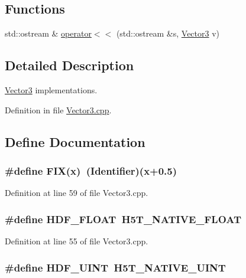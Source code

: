 \subsection*{Functions}
\begin{DoxyCompactItemize}
\item 
std::ostream \& \hyperlink{Vector3_8cpp_a751d7222f22f7264709359319164fdcd}{operator$<$$<$} (std::ostream \&s, \hyperlink{classVector3}{Vector3} v)
\end{DoxyCompactItemize}


\subsection{Detailed Description}
\hyperlink{classVector3}{Vector3} implementations. 

Definition in file \hyperlink{Vector3_8cpp_source}{Vector3.cpp}.



\subsection{Define Documentation}
\subsubsection[{FIX}]{\setlength{\rightskip}{0pt plus 5cm}\#define FIX(x)~({\bf Identifier})(x+0.5)}\label{Vector3_8cpp_a740431a9a1d25e39e670cd5f48454ce4}


Definition at line 59 of file Vector3.cpp.

\subsubsection[{HDF\_\-FLOAT}]{\setlength{\rightskip}{0pt plus 5cm}\#define HDF\_\-FLOAT~H5T\_\-NATIVE\_\-FLOAT}\label{Vector3_8cpp_a669eec24b7fa0bce364dc2d08724da7b}


Definition at line 55 of file Vector3.cpp.

\subsubsection[{HDF\_\-UINT}]{\setlength{\rightskip}{0pt plus 5cm}\#define HDF\_\-UINT~H5T\_\-NATIVE\_\-UINT}\label{Vector3_8cpp_ac366362734c04742f3c0777e399648af}


